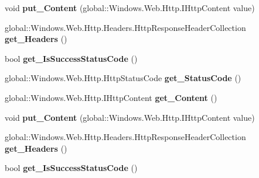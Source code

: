 \begin{DoxyCompactItemize}
void {\bfseries put\+\_\+\+Content} (global\+::\+Windows.\+Web.\+Http.\+I\+Http\+Content value)
\item 
\mbox{\label{interface_windows_1_1_web_1_1_http_1_1_i_http_response_message_a6e4729e8452970899c28bff03d1c7559}} 
global\+::\+Windows.\+Web.\+Http.\+Headers.\+Http\+Response\+Header\+Collection {\bfseries get\+\_\+\+Headers} ()
\item 
\mbox{\label{interface_windows_1_1_web_1_1_http_1_1_i_http_response_message_a51eb8ecfec42519640fcb872df413f76}} 
bool {\bfseries get\+\_\+\+Is\+Success\+Status\+Code} ()
\item 
\mbox{\label{interface_windows_1_1_web_1_1_http_1_1_i_http_response_message_a707bd9334321d44dcf0d6b634c37b9f0}} 
global\+::\+Windows.\+Web.\+Http.\+Http\+Status\+Code {\bfseries get\+\_\+\+Status\+Code} ()
\item 
\mbox{\label{interface_windows_1_1_web_1_1_http_1_1_i_http_response_message_a13c5befebc999b269bc778dfe5452380}} 
global\+::\+Windows.\+Web.\+Http.\+I\+Http\+Content {\bfseries get\+\_\+\+Content} ()
\item 
\mbox{\label{interface_windows_1_1_web_1_1_http_1_1_i_http_response_message_afa96abe89f1a2c3c66e7d5bf323394be}} 
void {\bfseries put\+\_\+\+Content} (global\+::\+Windows.\+Web.\+Http.\+I\+Http\+Content value)
\item 
\mbox{\label{interface_windows_1_1_web_1_1_http_1_1_i_http_response_message_a6e4729e8452970899c28bff03d1c7559}} 
global\+::\+Windows.\+Web.\+Http.\+Headers.\+Http\+Response\+Header\+Collection {\bfseries get\+\_\+\+Headers} ()
\item 
\mbox{\label{interface_windows_1_1_web_1_1_http_1_1_i_http_response_message_a51eb8ecfec42519640fcb872df413f76}} 
bool {\bfseries get\+\_\+\+Is\+Success\+Status\+Code} ()

\end{DoxyCompactItemize}

